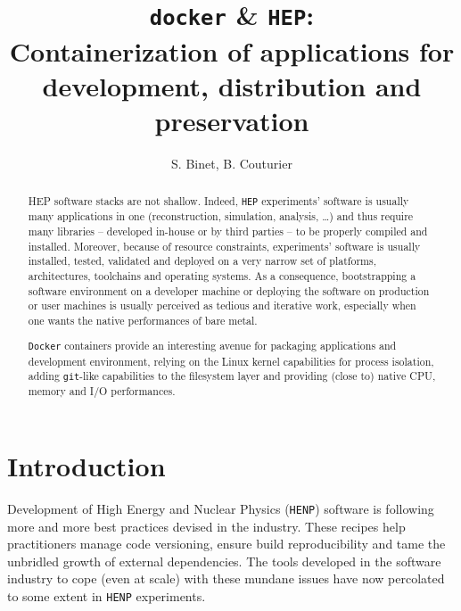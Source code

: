 \documentclass[a4paper]{jpconf}
\begin{document}
\title{\texttt{docker} \& \texttt{HEP}:\\Containerization of applications for
development, distribution and preservation}



\author{
  S. Binet, 
  B. Couturier\\
}


\begin{abstract}

HEP software stacks are not shallow.
Indeed, \texttt{HEP} experiments' software is usually many applications in one
(reconstruction, simulation, analysis, \ldots) and thus require many libraries --
developed in-house or by third parties -- to be properly compiled and installed.
Moreover, because of resource constraints, experiments' software is usually
installed, tested, validated and deployed on a very narrow set of platforms,
architectures, toolchains and operating systems.
As a consequence, bootstrapping a software environment on a developer machine or
deploying the software on production or user machines is usually perceived as
tedious and iterative work, especially when one wants the native performances of bare metal.

\texttt{Docker} containers provide an interesting avenue for packaging
applications and development environment, relying on the Linux kernel
capabilities for process isolation, adding \texttt{git}-like capabilities to the
filesystem layer and providing (close to) native CPU, memory and I/O performances.

\end{abstract}

\section{Introduction}

Development of High Energy and Nuclear Physics (\texttt{HENP}) software is
following more and more best practices devised in the industry.
These recipes help practitioners manage code versioning, ensure build
reproducibility and tame the unbridled growth of external
dependencies.
The tools developed in the software industry to cope (even at scale) with these
mundane issues have now percolated to some extent in \texttt{HENP} experiments.
\end{document}

